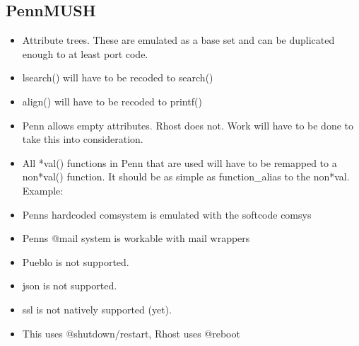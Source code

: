 \documentclass[letterpaper,10pt,english]{sphinxmanual}
\begin{document}
\subsection{PennMUSH}
\label{\detokenize{differences:pennmush}}\begin{itemize}
\item {} 
\sphinxAtStartPar
Attribute trees.  These are emulated as a base set and can be duplicated enough to at least port code.

\item {} 
\sphinxAtStartPar
lsearch() will have to be recoded to search()

\item {} 
\sphinxAtStartPar
align() will have to be recoded to printf()

\item {} 
\sphinxAtStartPar
Penn allows empty attributes.  Rhost does not.  Work will have to be done to take this into consideration.

\item {} 
\sphinxAtStartPar
All *val() functions in Penn that are used will have to be remapped to a non\sphinxhyphen{}*val() function.  It should be as simple as function\_alias to the non\sphinxhyphen{}*val.  Example:

\begin{sphinxVerbatim}[commandchars=\\\{\}]
  
\end{sphinxVerbatim}

\item {} 
\sphinxAtStartPar
Penn\textquotesingle{}s hardcoded comsystem is emulated with the softcode comsys

\item {} 
\sphinxAtStartPar
Penn\textquotesingle{}s @mail system is workable with mail wrappers

\item {} 
\sphinxAtStartPar
Pueblo is not supported.

\item {} 
\sphinxAtStartPar
json is not supported.

\item {} 
\sphinxAtStartPar
ssl is not natively supported (yet).

\item {} 
\sphinxAtStartPar
This uses @shutdown/restart, Rhost uses @reboot

\end{itemize}
\end{document}
